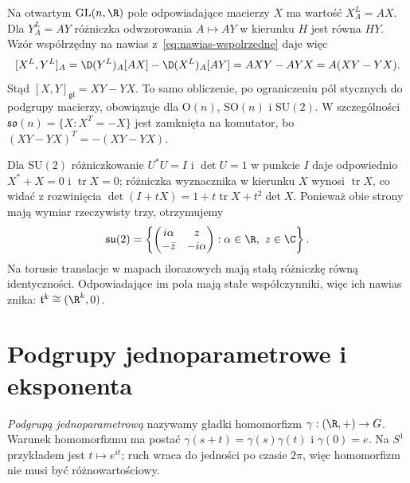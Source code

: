 \begin{przyklad}
\label{prz:lie-bracket-matrix}
Na otwartym $\mathrm{GL}(n,\R)$ pole odpowiadające macierzy
$X$ ma wartość $X^L_A=AX$. Dla $Y^L_A=AY$ różniczka
odwzorowania $A\mapsto AY$ w kierunku $H$ jest równa $HY$.
Wzór współrzędny na nawias z~\eqref{eq:nawias-wspolrzedne}
daje więc
\[
 [X^L,Y^L]_A
 =\D(Y^L)_A[AX]-\D(X^L)_A[AY]
 =AXY-AYX=A(XY-YX).
\]
Stąd $[X,Y]_{\mathfrak{gl}}=XY-YX$. To samo obliczenie,
po ograniczeniu pól stycznych do podgrupy macierzy, obowiązuje
dla $\mathrm O(n)$, $\mathrm{SO}(n)$ i $\mathrm{SU}(2)$.
W szczególności
$\mathfrak{so}(n)=\{X:X^T=-X\}$ jest zamknięta na komutator,
bo $(XY-YX)^T=-(XY-YX)$.

Dla $\mathrm{SU}(2)$ różniczkowanie $U^*U=I$ i $\det U=1$
w punkcie $I$ daje odpowiednio $X^*+X=0$ i
$\operatorname{tr}X=0$; różniczka wyznacznika w kierunku
$X$ wynosi $\operatorname{tr}X$, co widać z rozwinięcia
$\det(I+tX)=1+t\operatorname{tr}X+t^2\det X$.
Ponieważ obie strony mają wymiar
rzeczywisty trzy, otrzymujemy
\[
 \mathfrak{su}(2)
 =\left\{\begin{pmatrix}i\alpha&z\\-\bar z&-i\alpha\end{pmatrix}
 :\alpha\in\R,\ z\in\C\right\}.
\]
Na torusie translacje w mapach ilorazowych mają stałą
różniczkę równą identyczności. Odpowiadające im pola mają
stałe współczynniki, więc ich nawias znika:
$\mathfrak t^k\cong(\R^k,0)$.
\end{przyklad}

\section{Podgrupy jednoparametrowe i eksponenta}
\label{sec:lie-exponential}

\begin{definicja}
\label{def:one-parameter}
\emph{Podgrupą jednoparametrową} nazywamy gładki
homomorfizm $\gamma:(\R,+)\to G$.
Warunek homomorfizmu ma postać
$\gamma(s+t)=\gamma(s)\gamma(t)$ i $\gamma(0)=e$.
Na $S^1$ przykładem jest $t\mapsto e^{it}$; ruch wraca
do jedności po czasie $2\pi$, więc homomorfizm nie musi być
różnowartościowy.
\end{definicja}

